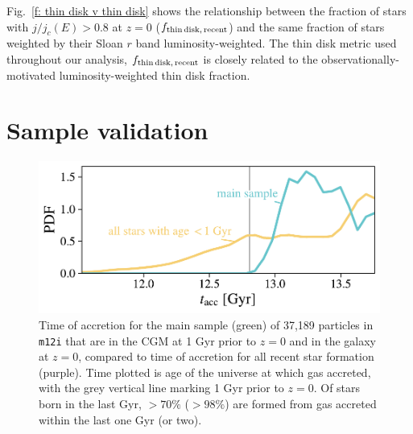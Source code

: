\documentclass[fleqn,usenatbib]{mnras}
\newcommand{\fthin}{f_{\rm thin\,disk,\,recent}}
\begin{document}
Fig.~\ref{f: thin disk v thin disk} shows the relationship between the fraction of stars with $j/j_c(E)>0.8$ at $z=0$ ($\fthin$) and the same fraction of stars weighted by their Sloan $r$ band luminosity-weighted.
The thin disk metric used throughout our analysis, $\fthin$ is closely related to the observationally-motivated luminosity-weighted thin disk fraction.

\section{Sample validation}
\label{s: appendix-sample validation}

\begin{figure}
    \centering
    \includegraphics[width=\columnwidth]{figures/selected_to_all_comparison/tacc_m12i_md.pdf}
    \caption{
    Time of accretion for the main sample (green) of 37,189 particles in \texttt{m12i} that are in the CGM at 1 Gyr prior to $z=0$ and in the galaxy at $z=0$, compared to time of accretion for all recent star formation (purple).
    Time plotted is age of the universe at which gas accreted, with the grey vertical line marking 1 Gyr prior to $z=0$.
    Of stars born in the last Gyr, $> 70\%$ ($> 98\%$) are formed from gas accreted within the last one Gyr (or two).
    }
    \label{f: sample validation -- tacc}
\end{figure}
\end{document}

